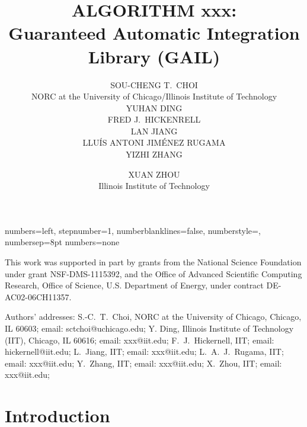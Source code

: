 \documentclass[acmtoms]{doc_acmtrans2m}
\title{ALGORITHM xxx:
      \\Guaranteed Automatic Integration Library (GAIL)}
\author{SOU-CHENG T.~CHOI
     \\NORC at the University of Chicago/Illinois Institute of Technology
     \\YUHAN DING
     \\FRED J.~HICKENRELL
     \\LAN JIANG
     \\LLU\'{I}S ANTONI JIM\'{E}NEZ RUGAMA
     \\YIZHI ZHANG 
     \and XUAN ZHOU
     \\Illinois Institute of  Technology }
\begin{document}
{numbers=left, stepnumber=1, numberblanklines=false,
numberstyle=\tiny, numbersep=8pt}
{numbers=none}

\lstset{
language=[90]Fortran, %
basicstyle=\small,    %
style=numbers,        %
emptylines=*1,        %
breaklines=true,      %
escapeinside=<>,      %
framesep=2.5mm,       %
}


\begin{bottomstuff}
This work was supported in part by grants from
the National Science Foundation under grant NSF-DMS-1115392, and
the Office of Advanced Scientific Computing Research, Office of Science, 
U.S. Department of Energy, under contract DE-AC02-06CH11357. 

Authors' addresses:
%
   S.-C.~T.~Choi, NORC at the University of Chicago,
   Chicago, IL 60603; email: sctchoi@uchicago.edu;
%  
   Y. Ding, Illinois Institute of Technology (IIT),
   Chicago, IL 60616; email: xxx@iit.edu;  
%
   F.~J.~Hickernell, IIT; email: hickernell@iit.edu; 
%
   L.~Jiang, IIT; email: xxx@iit.edu; 
%
   L.~A.~J.~Rugama, IIT; email: xxx@iit.edu; 
%
   Y.~Zhang, IIT; email: xxx@iit.edu; 
%
   X.~Zhou, IIT; email: xxx@iit.edu; 
\end{bottomstuff}


\maketitle

\clearpage


\section{Introduction} \label{sec:intro}  

 
 
\end{document}
